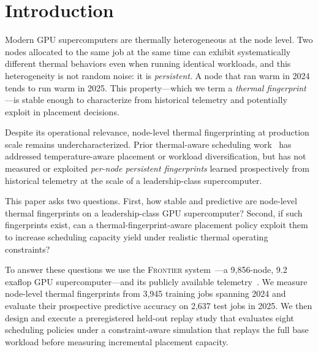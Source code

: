 \documentclass[acmsmall,screen,review,anonymous]{acmart}
\newcommand{\Frontier}{\textsc{Frontier}\xspace}
\begin{document}
\section{Introduction}
\label{sec:intro}

Modern GPU supercomputers are thermally heterogeneous at the node level.  Two nodes
allocated to the same job at the same time can exhibit systematically different thermal
behaviors even when running identical workloads, and this heterogeneity is not random
noise: it is \emph{persistent}.  A node that ran warm in 2024 tends to run warm in 2025.
This property---which we term a \emph{thermal fingerprint}---is stable enough to
characterize from historical telemetry and potentially exploit in placement decisions.

Despite its operational relevance, node-level thermal fingerprinting at production scale
remains undercharacterized.  Prior thermal-aware scheduling work~\cite{fan2007power,
inadomi2015hpc,ostrouchov2020machine,sinha2023thermal} has addressed temperature-aware
placement or workload diversification, but has not measured or exploited \emph{per-node
persistent fingerprints} learned prospectively from historical telemetry at the scale of
a leadership-class supercomputer.

This paper asks two questions.  First, how stable and predictive are node-level thermal
fingerprints on a leadership-class GPU supercomputer?  Second, if such fingerprints exist,
can a thermal-fingerprint-aware placement policy exploit them to increase scheduling
capacity yield under realistic thermal operating constraints?

To answer these questions we use the \Frontier system~\cite{frontier_userguide}---a
9,856-node, 9.2 exaflop GPU supercomputer---and its publicly available
telemetry~\cite{frontier_olcf_dataset}.  We measure node-level thermal fingerprints from
3,945 training jobs spanning 2024 and evaluate their prospective predictive accuracy on
2,637 test jobs in 2025.  We then design and execute a preregistered held-out replay
study that evaluates eight scheduling policies under a constraint-aware simulation that
replays the full base workload before measuring incremental placement capacity.
\end{document}
